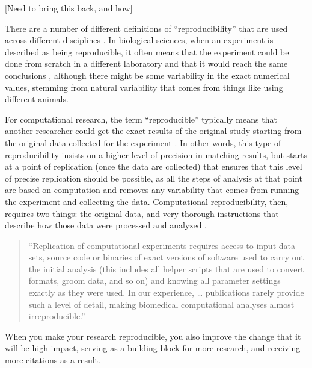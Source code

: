 \documentclass[]{tufte-book}
\begin{document}
{[}Need to bring this back, and how{]}

There are a number of different definitions of ``reproducibility'' that are used
across different disciplines \citep{stark2018before}. In biological sciences, when
an experiment is described as being reproducible, it often means that the
experiment could be done from scratch in a different laboratory and that it
would reach the same conclusions \citep{stark2018before}, although there might be
some variability in the exact numerical values, stemming from natural
variability that comes from things like using different animals.

For computational research, the term ``reproducible'' typically means that another
researcher could get the exact results of the original study starting from the
original data collected for the experiment \citep{stark2018before}. In other words,
this type of reproducibility insists on a higher level of precision in matching
results, but starts at a point of replication (once the data are collected) that
ensures that this level of precise replication should be possible, as all the
steps of analysis at that point are based on computation and removes any
variability that comes from running the experiment and collecting the data.
Computational reproducibility, then, requires two things: the original data,
and very thorough instructions that describe how those data were processed and
analyzed \citep{nekrutenko2012next}.

\begin{quote}
``Replication of computational experiments requires access to input data sets,
source code or binaries of exact versions of software used to carry out the
initial analysis (this includes all helper scripts that are used to convert
formats, groom data, and so on) and knowing all parameter settings exactly as
they were used. In our experience, \ldots{} publications rarely provide such a level
of detail, making biomedical computational analyses almost irreproducible.''
\citep{nekrutenko2012next}
\end{quote}

When you make your research reproducible, you also improve the change
that it will be high impact, serving as a building block for more research,
and receiving more citations as a result.
\end{document}
